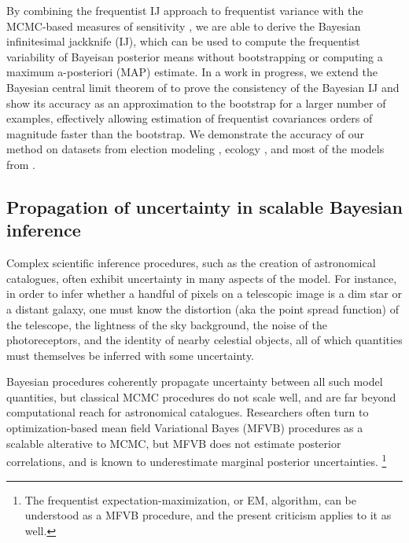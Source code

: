 By combining the frequentist IJ \citep{jaeckel:1972:infinitesimal,
shao:2012:jackknife, giordano:2019:ij} approach to frequentist variance with the
MCMC-based measures of sensitivity \citep{gustafson:2012:localrobustnessbook,
giordano:2018:covariances}, we are able to derive the Bayesian infinitesimal
jackknife (IJ), which can be used to compute the frequentist variability of
Bayeisan posterior means without bootstrapping or computing a maximum
a-posteriori (MAP) estimate.  In a work in progress, we extend the Bayesian
central limit theorem of \citet{lehman:1983:pointestimation,
kass:1990:posteriorexpansions} to prove the consistency of the Bayesian IJ and
show its accuracy as an approximation to the bootstrap for a larger number of
examples, effectively allowing estimation of frequentist covariances orders of
magnitude faster than the bootstrap.  We demonstrate the accuracy of our method
on datasets from election modeling \citep{economist:2020:election}, ecology \citep{kery:2011:bayesian}, and most of
the models from \citep{gelman:2006:arm, stan-examples:2017}.


\subsection*{Propagation of uncertainty in scalable Bayesian inference}

Complex scientific inference procedures, such as the creation of astronomical
catalogues, often exhibit uncertainty in many aspects of the model.  For
instance, in order to infer whether a handful of pixels on a telescopic image is
a dim star or a distant galaxy, one must know the distortion (aka the point
spread function) of the telescope, the lightness of the sky background, the
noise of the photoreceptors, and the identity of nearby celestial objects, all
of which quantities must themselves be inferred with some uncertainty.

Bayesian procedures coherently propagate uncertainty between all such model
quantities, but classical MCMC procedures do not scale well, and are far beyond
computational reach for astronomical catalogues.  Researchers often turn to
optimization-based mean field Variational Bayes (MFVB) procedures as a scalable
alterative to MCMC, but MFVB does not estimate posterior correlations, and is
known to underestimate marginal posterior uncertainties.
\footnote{The frequentist expectation-maximization, or EM, algorithm,
can be understood as a MFVB procedure, and the present criticism applies
to it as well.}

